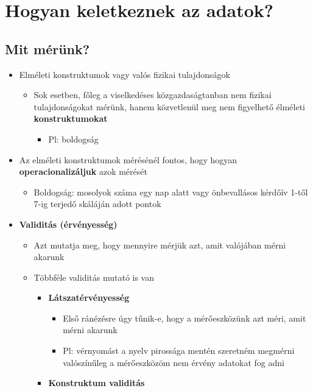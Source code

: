 \documentclass[
  letterpaper,
  DIV=11,
  numbers=noendperiod]{scrreprt}
\providecommand{\tightlist}{%
  \setlength{\itemsep}{0pt}\setlength{\parskip}{0pt}}\usepackage{longtable,booktabs,array}
\begin{document}
\hypertarget{hogyan-keletkeznek-az-adatok}{%
\section{Hogyan keletkeznek az
adatok?}\label{hogyan-keletkeznek-az-adatok}}

\hypertarget{mit-muxe9ruxfcnk}{%
\subsection{Mit mérünk?}\label{mit-muxe9ruxfcnk}}

\begin{itemize}
\item
  Elméleti konstruktumok vagy valós fizikai tulajdonságok

  \begin{itemize}
  \item
    Sok esetben, főleg a viselkedéses közgazdaságtanban nem fizikai
    tulajdonságokat mérünk, hanem közvetlenül meg nem figyelhető
    élméleti \textbf{konstruktumokat}

    \begin{itemize}
    \tightlist
    \item
      Pl: boldogság
    \end{itemize}
  \end{itemize}
\item
  Az elméleti konstruktumok mérésénél fontos, hogy hogyan
  \textbf{operacionalizáljuk} azok mérését

  \begin{itemize}
  \tightlist
  \item
    Boldogság: mosolyok száma egy nap alatt vagy önbevallásos kérdőív
    1-től 7-ig terjedő skáláján adott pontok
  \end{itemize}
\item
  \textbf{Validitás (érvényesség)}

  \begin{itemize}
  \item
    Azt mutatja meg, hogy mennyire mérjük azt, amit valójában mérni
    akarunk
  \item
    Többféle validitás mutató is van

    \begin{itemize}
    \item
      \textbf{Látszatérvényesség}

      \begin{itemize}
      \item
        Első ránézésre úgy tűnik-e, hogy a mérőeszközünk azt méri, amit
        mérni akarunk
      \item
        Pl: vérnyomást a nyelv pirossága mentén szeretném megmérni
        valószínűleg a mérőeszközöm nem érvény adatokat fog adni
      \end{itemize}
    \item
      \textbf{Konstruktum validitás}


\end{itemize}
\end{itemize}
\end{itemize}
\end{document}
